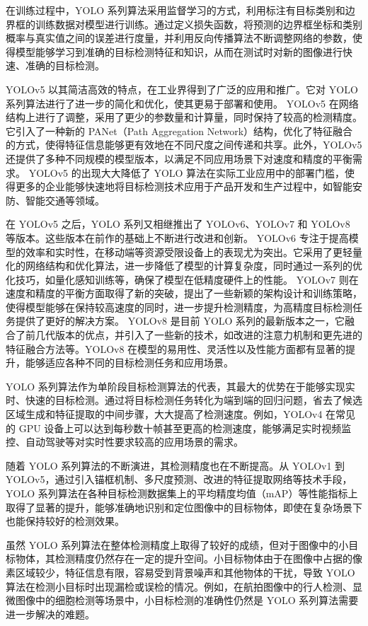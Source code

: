 在训练过程中，YOLO 系列算法采用监督学习的方式，利用标注有目标类别和边界框的训练数据对模型进行训练。通过定义损失函数，将预测的边界框坐标和类别概率与真实值之间的误差进行度量，并利用反向传播算法不断调整网络的参数，使得模型能够学习到准确的目标检测特征和知识，从而在测试时对新的图像进行快速、准确的目标检测。


YOLOv5 以其简洁高效的特点，在工业界得到了广泛的应用和推广。它对 YOLO 系列算法进行了进一步的简化和优化，使其更易于部署和使用。
YOLOv5 在网络结构上进行了调整，采用了更少的参数量和计算量，同时保持了较高的检测精度。它引入了一种新的 PANet（Path Aggregation Network）结构，优化了特征融合的方式，使得特征信息能够更有效地在不同尺度之间传递和共享。此外，YOLOv5 还提供了多种不同规模的模型版本，以满足不同应用场景下对速度和精度的平衡需求。
YOLOv5 的出现大大降低了 YOLO 算法在实际工业应用中的部署门槛，使得更多的企业能够快速地将目标检测技术应用于产品开发和生产过程中，如智能安防、智能交通等领域。

在 YOLOv5 之后，YOLO 系列又相继推出了 YOLOv6、YOLOv7 和 YOLOv8 等版本。这些版本在前作的基础上不断进行改进和创新。
YOLOv6 专注于提高模型的效率和实时性，在移动端等资源受限设备上的表现尤为突出。它采用了更轻量化的网络结构和优化算法，进一步降低了模型的计算复杂度，同时通过一系列的优化技巧，如量化感知训练等，确保了模型在低精度硬件上的性能。
YOLOv7 则在速度和精度的平衡方面取得了新的突破，提出了一些新颖的架构设计和训练策略，使得模型能够在保持较高速度的同时，进一步提升检测精度，为高精度目标检测任务提供了更好的解决方案。
YOLOv8 是目前 YOLO 系列的最新版本之一，它融合了前几代版本的优点，并引入了一些新的技术，如改进的注意力机制和更先进的特征融合方法等。YOLOv8 在模型的易用性、灵活性以及性能方面都有显著的提升，能够适应各种不同的目标检测任务和应用场景。


YOLO 系列算法作为单阶段目标检测算法的代表，其最大的优势在于能够实现实时、快速的目标检测。通过将目标检测任务转化为端到端的回归问题，省去了候选区域生成和特征提取的中间步骤，大大提高了检测速度。例如，YOLOv4 在常见的 GPU 设备上可以达到每秒数十帧甚至更高的检测速度，能够满足实时视频监控、自动驾驶等对实时性要求较高的应用场景的需求。

随着 YOLO 系列算法的不断演进，其检测精度也在不断提高。从 YOLOv1 到 YOLOv5，通过引入锚框机制、多尺度预测、改进的特征提取网络等技术手段，YOLO 系列算法在各种目标检测数据集上的平均精度均值（mAP）等性能指标上取得了显著的提升，能够准确地识别和定位图像中的目标物体，即使在复杂场景下也能保持较好的检测效果。

虽然 YOLO 系列算法在整体检测精度上取得了较好的成绩，但对于图像中的小目标物体，其检测精度仍然存在一定的提升空间。小目标物体由于在图像中占据的像素区域较少，特征信息有限，容易受到背景噪声和其他物体的干扰，导致 YOLO 算法在检测小目标时出现漏检或误检的情况。例如，在航拍图像中的行人检测、显微图像中的细胞检测等场景中，小目标检测的准确性仍然是 YOLO 系列算法需要进一步解决的难题。

